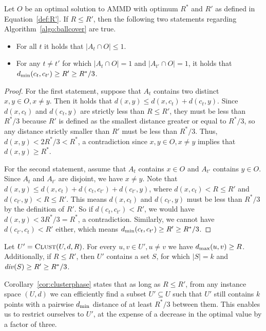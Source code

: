 \begin{prop}
\label{prop:cluster}
Let $O$ be an optimal solution to AMMD with optimum $R^*$ and $R'$ as defined in Equation~\ref{def:R'}.
If $R \leq R'$, then the following two statements regarding Algorithm~\ref{algo:ballcover} are true.
\begin{itemize}
\item For all $t$ it holds that $|A_t \cap O| \leq 1$.
\item For any $t\neq t'$ for which $|A_t \cap O|=1$ and $|A_{t'} \cap O|=1$, it holds that $d_{\text{min}}(c_t,c_{t'}) \geq R' \geq R^*/3$.
\end{itemize}
\end{prop}
\begin{proof}
For the first statement, suppose that $A_t$ contains two distinct $x, y \in O, x \neq y$.
Then it holds that $d(x,y) \leq d(x,c_t)+d(c_t,y)$. Since $d(x,c_t)$ and $d(c_t,y)$ are strictly less than $R\leq R'$, they must be less than $R^*/3$ because $R'$ is defined as the smallest distance greater or equal to $R^*/3$, so any distance strictly smaller than $R'$ must be less than $R^*/3$. Thus, $d(x,y) < 2R^*/3 < R^*$, a contradiction since $x, y \in O, x \neq y$ implies that $d(x,y) \geq R^*$.

For the second statement, assume that $A_t$ contains $x \in O$ and $A_{t'}$ contains $y \in O$. Since $A_t$ and $A_{t'}$ are disjoint, we have $x \neq y$. Note that $d(x,y) \leq d(x,c_t)+d(c_t,c_{t'})+d(c_{t'},y)$, where $d(x,c_t)<R \leq R'$ and $d(c_{t'},y)<R \leq R'$. This means $d(x,c_t)$ and $d(c_{t'},y)$ must be less than $R^*/3$ by the definition of $R'$. So if $d(c_t,c_{t'}) < R'$, we would have $d(x,y) < 3 R^*/3 = R^*$, a contradiction. Similarly, we cannot have $d(c_{t'},c_t) < R'$ either, which means $d_{\text{min}}(c_t,c_{t'}) \geq R' \geq R^*/3$.
\end{proof}

\begin{corollary}
\label{cor:clusterphase}
Let ${U}' = \algclust{U, d, R}$.
For every $u, v \in {U}', u \neq v$ we have $d_{\text{max}}(u,v) \geq R$. Additionally, if $R \leq R'$, then ${U}'$ contains a set $S$, for which $|S| = k$ and $\diver{S} \geq R' \geq R^*/3$.

\end{corollary}
 
Corollary~\ref{cor:clusterphase} states that as long as $R \leq R'$, from any instance space $(U, d)$ we can efficiently find a subset ${U}' \subseteq U$ 
such that ${U}'$ still contains $k$ points with a pairwise $d_{\text{min}}$ distance of at least $R^*/3$ between them. This enables us to restrict ourselves to ${U}'$, at the expense of a decrease in the optimal value by a factor of three.


